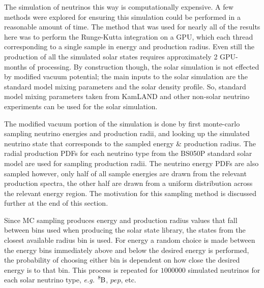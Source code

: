 The simulation of neutrinos this way is computationally expensive. A few methods
were explored for ensuring this simulation could be performed in a reasonable
amount of time. The method that was used for nearly all of the results here was
to perform the Runge-Kutta integration on a GPU, which each thread corresponding
to a single sample in energy and production radius.
Even still the production of all the simulated solar states requires approximately
2 GPU-months of processing.
By construction though, the solar simulation is not effected by modified
vacuum potential; the main inputs to the solar simulation are the standard model
mixing parameters and the solar density profile. So, standard model mixing parameters
taken from KamLAND and other non-solar neutrino experiments can be used for
the solar simulation.


The modified vacuum portion of the simulation is done by first monte-carlo sampling
neutrino energies and production radii, and looking up the simulated
neutrino state that corresponds to the sampled energy \& production radius.
The radial production PDFs for each neutrino type from the BS050P standard
solar model are used for sampling production radii.
The neutrino energy PDFs are also sampled
however, only half of all sample energies are drawn from the relevant production
spectra, the other half are drawn from a uniform distribution across the
relevant energy region.
The motivation for this sampling method is discussed further at the end of
this section.

Since MC sampling produces energy and production radius values that fall
between bins used when producing the solar state library, the states
from the closest available radius bin is used. For energy
a random choice is made between the energy bins immediately above and below
the desired energy is performed, the probability of choosing either bin
is dependent on how close the desired energy is to that bin.
This process is repeated for $1000000$ simulated neutrinos for each solar
neutrino type, \textit{e.g.} $\ce{^{8}B}$, $pep$, etc.

